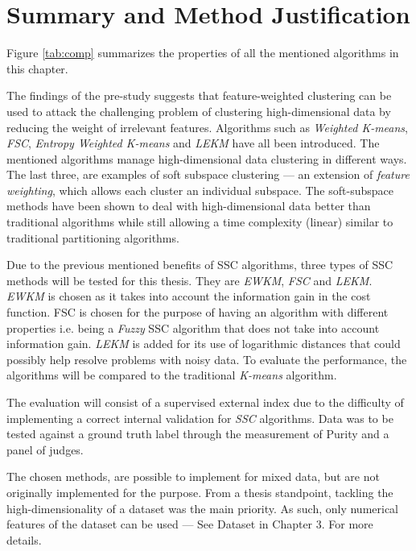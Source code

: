 \documentclass[../report.tex]{subfiles}
\begin{document}
\section{Summary and Method Justification}

Figure \ref{tab:comp} summarizes the properties of all the mentioned algorithms in this chapter.\newline

The findings of the pre-study suggests that feature-weighted clustering can be used to attack the challenging problem of clustering high-dimensional data by reducing the weight of irrelevant features. Algorithms such as \textit{Weighted K-means}, \textit{FSC}, \textit{Entropy Weighted K-means} and \textit{LEKM} have all been introduced.  The mentioned algorithms manage high-dimensional data clustering in different ways. The last three, are examples of soft subspace clustering --- an extension of \textit{feature weighting}, which allows each cluster an individual subspace. The soft-subspace methods have been shown to deal with high-dimensional data better than traditional algorithms while still allowing a time complexity (linear) similar to traditional partitioning algorithms.\newline

Due to the previous mentioned benefits of SSC algorithms, three types of SSC methods will be tested for this thesis. They are \textit{EWKM}, \textit{FSC} and \textit{LEKM}. \textit{EWKM} is chosen as it takes into account the information gain in the cost function. FSC is chosen for the purpose of having an algorithm with different properties i.e. being a \textit{Fuzzy} SSC algorithm that does not take into account information gain. \textit{LEKM} is added for its use of logarithmic distances that could possibly help resolve problems with noisy data. To evaluate the performance, the algorithms will be compared to the traditional \textit{K-means} algorithm.\newline

The evaluation will consist of a supervised external index due to the difficulty of implementing a correct internal validation for \textit{SSC} algorithms. Data was to be tested against a ground truth label through the measurement of Purity and a panel of judges.\newline

The chosen methods, are possible to implement for mixed data, but are not originally implemented for the purpose. From a thesis standpoint, tackling the high-dimensionality of a dataset was the main priority. As such, only numerical features of the dataset can be used --- See Dataset in Chapter 3. For more details. \newline
\end{document}

